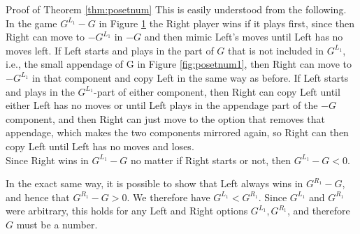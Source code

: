 \begin{proof2}{Proof of Theorem \ref{thm:posetnum}}
This is easily understood from the following. In the game $G^{L_1}-G$ in Figure \ref{fig:posetnum2} the Right player wins if it plays first, since then Right can move to $-G^{L_1}$ in $-G$ and then mimic Left's moves until Left has no moves left. If Left starts and plays in the part of $G$ that is not included in $G^{L_1}$, i.e., the small appendage of G in Figure \ref{fig:posetnum1}, then Right can move to $-G^{L_1}$ in that component and copy Left in the same way as before. If Left starts and plays in the $G^{L_1}$-part of either component, then Right can copy Left until either Left has no moves or until Left plays in the appendage part of the $-G$ component, and then Right can just move to the option that removes that appendage, which makes the two components mirrored again, so Right can then copy Left until Left has no moves and loses.
\\
Since Right wins in $G^{L_1}-G$ no matter if Right starts or not, then $G^{L_1}-G<0$.
\begin{figure}[H]
\centering
{}
{
}
\label{fig:posetnum2}
\end{figure}
In the exact same way, it is possible to show that Left always wins in $G^{R_1}-G$, and hence that $G^{R_1}-G>0$. We therefore have $G^{L_1}<G^{R_1}$. Since $G^{L_1}$ and $G^{R_1}$ were arbitrary, this holds for any Left and Right options $G^{L_1},G^{R_1}$, and therefore $G$ must be a number.
\end{proof2}

